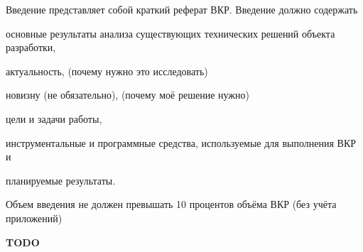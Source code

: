 Введение представляет собой краткий реферат ВКР. Введение должно содержать 

основные результаты анализа существующих технических решений объекта разработки, 

актуальность, (почему нужно это исследовать)

новизну (не обязательно), (почему моё решение нужно)

цели и задачи работы, 

инструментальные и программные средства, используемые для выполнения ВКР и 

планируемые результаты.

Объем введения не должен превышать 10 процентов объёма ВКР (без учёта приложений)

\textbf{\Huge TODO}